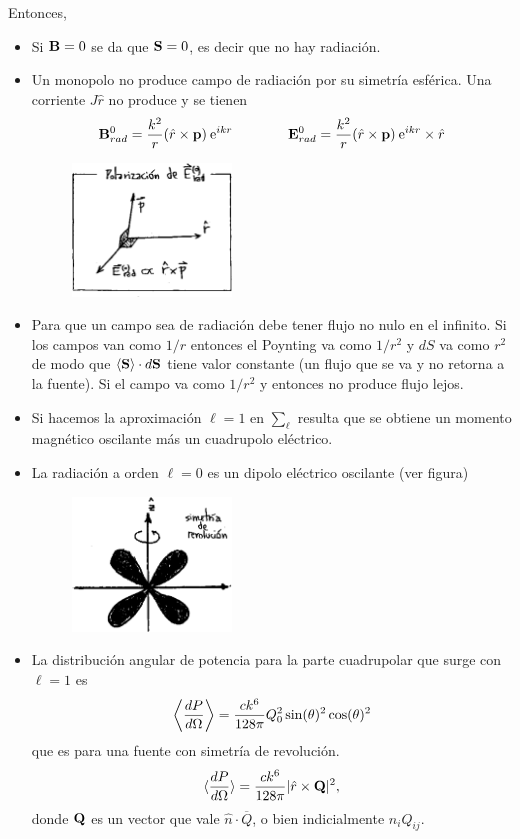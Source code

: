 \documentclass[10pt,oneside]{CBFT_book}
\begin{document}
Entonces, 
\begin{itemize}
 \item Si $\vb{B}=0$ se da que $\vb{S}=0$, es decir que no hay radiación.
 \item Un monopolo no produce campo de radiación por su simetría esférica.
 Una corriente $J\hat{r}$ no produce  y se tienen
 \[
	\vb{B}^0_{rad} = \frac{k^2}{r}( \hat{r} \times \vb{p} ) \euler^{ikr} \qquad \qquad 
	\vb{E}^0_{rad} = \frac{k^2}{r}( \hat{r} \times \vb{p} ) \euler^{ikr} \times \hat{r}
 \]
	\begin{figure}[htb]
		\begin{center}
		\includegraphics[width=0.4\textwidth]{images/fig_ft1_pot_irrad2.pdf}	 
		\end{center}
		\caption{}
	\end{figure} 
 \item Para que un campo sea de radiación debe tener flujo  no nulo en el infinito.
 Si los campos van como $1/r$ entonces el Poynting va como $1/r^2$ y $dS$ va como $r^2$
 de modo que $\langle\vb{S}\rangle \cdot d\vb{S}$ tiene valor constante (un flujo que se
 va y no retorna a la fuente). Si el campo va como $1/r^2$ y entonces no produce flujo
 lejos.
 \item Si hacemos la aproximación $\ell=1$ en $\sum_\ell$ resulta que se obtiene un momento
 magnético oscilante más un cuadrupolo eléctrico.
 \item La radiación a orden $\ell=0$ es un dipolo eléctrico oscilante (ver figura)
	\begin{figure}[htb]
		\begin{center}
		\includegraphics[width=0.4\textwidth]{images/fig_ft1_pot_irrad3.pdf}	 
		\end{center}
		\caption{}
	\end{figure} 
 \item La distribución angular de potencia para la parte cuadrupolar que surge con $\ell=1$ es
	\[
		\left\langle\frac{d^{\hspace{-0.05em}} {P}}{d {\Omega}^{\hspace{-0.05em}}}\right\rangle = \frac{ck^6}{128\pi} Q_0^2 \sin(\theta)^2 
\cos(\theta)^2
	\]
	que es para una fuente con simetría de revolución.
	\[
		\langle\dtot{P}{\Omega}\rangle = \frac{ck^6}{128\pi} |\hat{r} \times \vb{Q} |^2, 
	\]
	donde $\vb{Q}$ es un vector que vale $\hat{n} \cdot \overline{Q}$, o bien indicialmente $n_iQ_{ij}$.
\end{itemize}
\end{document}
